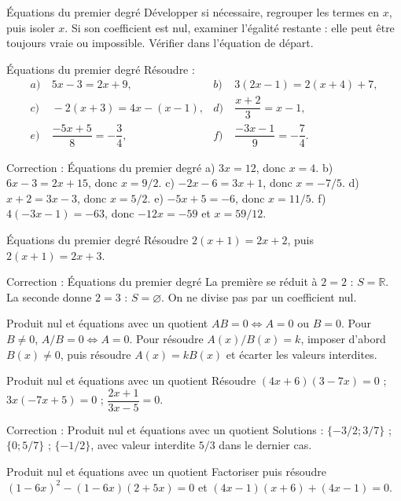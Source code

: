 \documentclass[aspectratio=169,10pt]{beamer}
\providecommand{\R}{\mathbb{R}}
\begin{document}
\begin{frame}{Équations du premier degré}
Développer si nécessaire, regrouper les termes en \(x\), puis isoler \(x\). Si son coefficient est nul, examiner l'égalité restante : elle peut être toujours vraie ou impossible. Vérifier dans l'équation de départ.
\end{frame}
\begin{frame}{Équations du premier degré}
Résoudre :
\[\begin{aligned}
a)&\ 5x-3=2x+9,& b)&\ 3(2x-1)=2(x+4)+7,\\
c)&\ -2(x+3)=4x-(x-1),&d)&\ \dfrac{x+2}{3}=x-1,\\
e)&\ \dfrac{-5x+5}{8}=-\dfrac34,&f)&\ \dfrac{-3x-1}{9}=-\dfrac74.
\end{aligned}\]
\end{frame}
\begin{frame}{Correction : Équations du premier degré}
a) \(3x=12\), donc \(x=4\). b) \(6x-3=2x+15\), donc \(x=9/2\). c) \(-2x-6=3x+1\), donc \(x=-7/5\). d) \(x+2=3x-3\), donc \(x=5/2\). e) \(-5x+5=-6\), donc \(x=11/5\). f) \(4(-3x-1)=-63\), donc \(-12x=-59\) et \(x=59/12\).
\end{frame}
\begin{frame}{Équations du premier degré}
Résoudre \(2(x+1)=2x+2\), puis \(2(x+1)=2x+3\).
\end{frame}
\begin{frame}{Correction : Équations du premier degré}
La première se réduit à \(2=2\) : \(S=\R\). La seconde donne \(2=3\) : \(S=\varnothing\). On ne divise pas par un coefficient nul.
\end{frame}
\begin{frame}{Produit nul et équations avec un quotient}
\(AB=0\iff A=0\) ou \(B=0\). Pour \(B\ne0\), \(A/B=0\iff A=0\). Pour résoudre \(A(x)/B(x)=k\), imposer d'abord \(B(x)\ne0\), puis résoudre \(A(x)=kB(x)\) et écarter les valeurs interdites.
\end{frame}
\begin{frame}{Produit nul et équations avec un quotient}
Résoudre \((4x+6)(3-7x)=0\) ; \(3x(-7x+5)=0\) ; \(\dfrac{2x+1}{3x-5}=0\).
\end{frame}
\begin{frame}{Correction : Produit nul et équations avec un quotient}
Solutions : \(\{-3/2;3/7\}\) ; \(\{0;5/7\}\) ; \(\{-1/2\}\), avec valeur interdite \(5/3\) dans le dernier cas.
\end{frame}
\begin{frame}{Produit nul et équations avec un quotient}
Factoriser puis résoudre \((1-6x)^2-(1-6x)(2+5x)=0\) et \((4x-1)(x+6)+(4x-1)=0\).
\end{frame}
\end{document}
